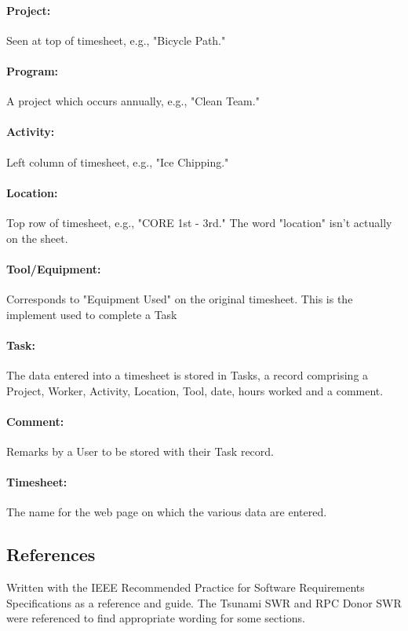 \documentclass[12pt]{article}
\begin{document}
\paragraph{Project:} Seen at top of timesheet, e.g., "Bicycle Path."
\paragraph{Program:} A project which occurs annually, e.g., "Clean Team."
\paragraph{Activity:} Left column of timesheet, e.g., "Ice Chipping."
\paragraph{Location:} Top row of timesheet, e.g., "CORE 1st - 3rd." The word "location" isn't actually on the sheet.
\paragraph{Tool/Equipment:} Corresponds to "Equipment Used" on the original timesheet. This is the implement used to complete a Task
\paragraph{Task:} The data entered into a timesheet is stored in Tasks, a record comprising a Project, Worker, Activity, Location, Tool, date, hours worked and a comment.
\paragraph{Comment:} Remarks by a User to be stored with their Task record.
\paragraph{Timesheet:} The name for the web page on which the various data are entered.


\subsection{References}
Written with the IEEE Recommended Practice for Software Requirements Specifications as a reference and guide. The Tsunami SWR and RPC Donor SWR were referenced to find appropriate wording for some sections.
\end{document}
